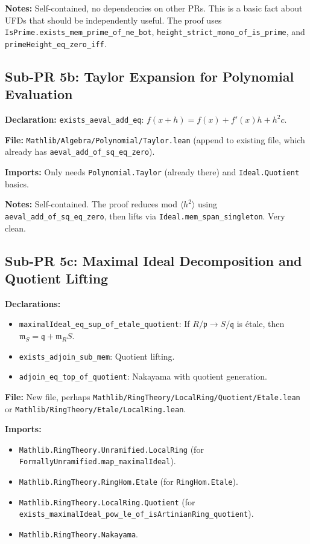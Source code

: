 \textbf{Notes:} Self-contained, no dependencies on other PRs.
This is a basic fact about UFDs that should be independently useful.
The proof uses \texttt{IsPrime.exists\_mem\_prime\_of\_ne\_bot},
\texttt{height\_strict\_mono\_of\_is\_prime}, and
\texttt{primeHeight\_eq\_zero\_iff}.

\subsection*{Sub-PR 5b: Taylor Expansion for Polynomial Evaluation}

\textbf{Declaration:}
\texttt{exists\_aeval\_add\_eq}: $f(x+h) = f(x) + f'(x)h + h^2 c$.

\textbf{File:} \texttt{Mathlib/Algebra/Polynomial/Taylor.lean}
(append to existing file, which already has
\texttt{aeval\_add\_of\_sq\_eq\_zero}).

\textbf{Imports:} Only needs \texttt{Polynomial.Taylor} (already there)
and \texttt{Ideal.Quotient} basics.

\textbf{Notes:} Self-contained. The proof reduces mod $\langle h^2 \rangle$
using \texttt{aeval\_add\_of\_sq\_eq\_zero}, then lifts via
\texttt{Ideal.mem\_span\_singleton}. Very clean.

\subsection*{Sub-PR 5c: Maximal Ideal Decomposition and Quotient Lifting}

\textbf{Declarations:}
\begin{itemize}
  \item \texttt{maximalIdeal\_eq\_sup\_of\_etale\_quotient}:
    If $R/\mathfrak{p} \to S/\mathfrak{q}$ is étale, then
    $\mathfrak{m}_S = \mathfrak{q} + \mathfrak{m}_R S$.
  \item \texttt{exists\_adjoin\_sub\_mem}: Quotient lifting.
  \item \texttt{adjoin\_eq\_top\_of\_quotient}: Nakayama with quotient generation.
\end{itemize}

\textbf{File:} New file, perhaps
\texttt{Mathlib/RingTheory/LocalRing/Quotient/Etale.lean} or
\texttt{Mathlib/RingTheory/Etale/LocalRing.lean}.

\textbf{Imports:}
\begin{itemize}
  \item \texttt{Mathlib.RingTheory.Unramified.LocalRing}
    (for \texttt{FormallyUnramified.}\allowbreak\texttt{map\_maximalIdeal}).
  \item \texttt{Mathlib.RingTheory.RingHom.Etale}
    (for \texttt{RingHom.Etale}).
  \item \texttt{Mathlib.RingTheory.LocalRing.Quotient}
    (for \texttt{exists\_maximalIdeal\_pow\_le\_of\_}\allowbreak\texttt{isArtinianRing\_quotient}).
  \item \texttt{Mathlib.RingTheory.Nakayama}.
\end{itemize}

